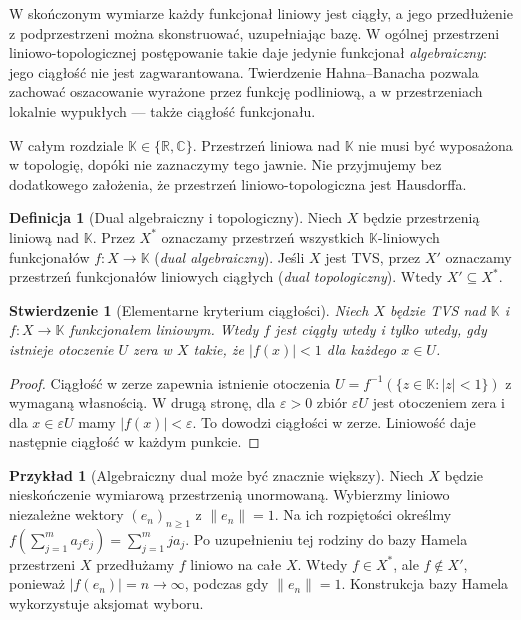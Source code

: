 \documentclass[11pt,a4paper]{article}
\numberwithin{equation}{section}
\theoremstyle{plain}
\newtheorem{stwierdzenie}[twierdzenie]{Stwierdzenie}
\theoremstyle{definition}
\newtheorem{definicja}[twierdzenie]{Definicja}
\newtheorem{przyklad}[twierdzenie]{Przykład}
\theoremstyle{remark}
\newcommand{\R}{\mathbb R}
\newcommand{\C}{\mathbb C}
\newcommand{\K}{\mathbb K}
\begin{document}
W skończonym wymiarze każdy funkcjonał liniowy jest ciągły, a jego
przedłużenie z podprzestrzeni można skonstruować, uzupełniając bazę.
W ogólnej przestrzeni liniowo-topologicznej postępowanie takie daje
jedynie funkcjonał \emph{algebraiczny}: jego ciągłość nie jest
zagwarantowana. Twierdzenie Hahna--Banacha pozwala zachować
oszacowanie wyrażone przez funkcję podliniową, a w przestrzeniach
lokalnie wypukłych --- także ciągłość funkcjonału.

W całym rozdziale $\K\in\{\R,\C\}$. Przestrzeń liniowa nad $\K$
nie musi być wyposażona w topologię, dopóki nie zaznaczymy tego
jawnie. Nie przyjmujemy bez dodatkowego założenia, że przestrzeń
liniowo-topologiczna jest Hausdorffa.

\begin{definicja}[Dual algebraiczny i topologiczny]\label{def:dual-topological}
Niech $X$ będzie przestrzenią liniową nad $\K$. Przez $X^*$
oznaczamy przestrzeń wszystkich $\K$-liniowych funkcjonałów
$f:X\to\K$ (\emph{dual algebraiczny}). Jeśli $X$ jest TVS,
przez $X'$ oznaczamy przestrzeń funkcjonałów liniowych ciągłych
(\emph{dual topologiczny}). Wtedy $X'\subseteq X^*$.
\end{definicja}

\begin{stwierdzenie}[Elementarne kryterium ciągłości]
\label{prop:dual-continuity}
Niech $X$ będzie TVS nad $\K$ i $f:X\to\K$ funkcjonałem
liniowym. Wtedy $f$ jest ciągły wtedy i tylko wtedy, gdy
istnieje otoczenie $U$ zera w $X$ takie, że $|f(x)|<1$
dla każdego $x\in U$.
\end{stwierdzenie}
\begin{proof}
Ciągłość w zerze zapewnia istnienie otoczenia
$U=f^{-1}(\{z\in\K:|z|<1\})$ z wymaganą własnością.
W drugą stronę, dla $\varepsilon>0$ zbiór
$\varepsilon U$ jest otoczeniem zera i dla $x\in\varepsilon U$
mamy $|f(x)|<\varepsilon$. To dowodzi ciągłości w zerze.
Liniowość daje następnie ciągłość w każdym punkcie.
\end{proof}

\begin{przyklad}[Algebraiczny dual może być znacznie większy]
\label{ex:discontinuous-functional}
Niech $X$ będzie nieskończenie wymiarową przestrzenią
unormowaną. Wybierzmy liniowo niezależne wektory $(e_n)_{n\ge1}$
z $\|e_n\|=1$. Na ich rozpiętości określmy
$f(\sum_{j=1}^m a_je_j)=\sum_{j=1}^m j a_j$.
Po uzupełnieniu tej rodziny do bazy Hamela przestrzeni $X$
przedłużamy $f$ liniowo na całe $X$. Wtedy $f\in X^*$,
ale $f\notin X'$, ponieważ $|f(e_n)|=n\to\infty$,
podczas gdy $\|e_n\|=1$. Konstrukcja bazy Hamela
wykorzystuje aksjomat wyboru.
\end{przyklad}
\end{document}
